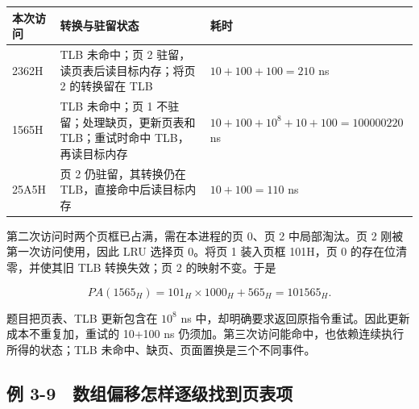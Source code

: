 \begin{wideblock}

\par\medskip\noindent\begin{minipage}{\linewidth}\fontsize{9.3}{12}\selectfont\begin{tabularx}{\linewidth}{@{}YYY@{}}
\toprule\noalign{}
\begin{minipage}[b]{\linewidth}\raggedright
本次访问
\end{minipage} & \begin{minipage}[b]{\linewidth}\raggedright
转换与驻留状态
\end{minipage} & \begin{minipage}[b]{\linewidth}\raggedright
耗时
\end{minipage} \\
\midrule\noalign{}


2362H & TLB 未命中；页 2 驻留，读页表后读目标内存；将页 2 的转换留在 TLB & \(10+100+100=210\) ns \\
1565H & TLB 未命中；页 1 不驻留；处理缺页，更新页表和 TLB；重试时命中 TLB，再读目标内存 & \(10+100+10^8+10+100=100000220\) ns \\
25A5H & 页 2 仍驻留，其转换仍在 TLB，直接命中后读目标内存 & \(10+100=110\) ns \\
\bottomrule\end{tabularx}
\end{minipage}\par\medskip

\end{wideblock}

第二次访问时两个页框已占满，需在本进程的页 0、页 2 中局部淘汰。页 2 刚被第一次访问使用，因此 LRU 选择页 0。将页 1 装入页框 101H，页 0 的存在位清零，并使其旧 TLB 转换失效；页 2 的映射不变。于是

\[PA(1565_H)=101_H\times1000_H+565_H=101565_H.\]

题目把页表、TLB 更新包含在 \(10^8\) ns 中，却明确要求返回原指令重试。因此更新成本不重复加，重试的 10+100 ns 仍须加。第三次访问能命中，也依赖连续执行所得的状态；TLB 未命中、缺页、页面置换是三个不同事件。

\subsection{例 3-9　数组偏移怎样逐级找到页表项}\label{OS03-ex5-9}

